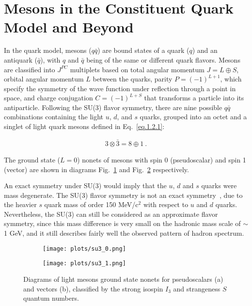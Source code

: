 \section{Mesons in the Constituent Quark Model and Beyond}
\label{p.1.2}

In the quark model, mesons ($q\bar{q}$) are bound states of a quark ($q$) and an antiquark ($\bar{q}$), with $q$ and $\bar{q}$ being of the same or different quark flavors. Mesons are classified into $J^{PC}$ multiplets based on  total angular momentum $J = L \oplus S$, orbital angular momentum $L$ between the quarks, parity $P=(-1)^{L+1}$, which specify the symmetry of the wave function under reflection through a point in space, and charge conjugation $C=(-1)^{L+S}$ that transforms a particle into its antiparticle. Following the SU(3) flavor symmetry, there are nine possible $q\bar{q}$ combinations containing the light $u$, $d$, and $s$ quarks, grouped into an octet and a singlet of light quark mesons defined in Eq.~\ref{eq.1.2.1}:

\begin{equation}
    \label{eq.1.2.1}
    \begin{aligned}
        3 \otimes \bar{3} = 8 \oplus 1~.
    \end{aligned}
\end{equation}

The ground state ($L=0$) nonets of mesons with spin 0 (pseudoscalar) and spin 1 (vector) are shown in diagrams Fig.~\ref{fig.1.2.1.a} and Fig.~\ref{fig.1.2.1.b} respectively.
~\par An exact symmetry under SU(3) would imply that the $u$, $d$ and $s$ quarks were mass degenerate. The SU(3) flavor symmetry is not an exact symmetry~\cite{Zweig64}, due to the heavier $s$ quark mass of order 150 MeV/c$^{2}$ with respect to $u$ and $d$ quarks. Nevertheless, the SU(3) can still be considered as an approximate flavor symmetry, since this mass difference is very small on the hadronic mass scale of $\sim$ 1 GeV, and it still describes fairly well the observed pattern of hadron spectrum.

\begin{figure}[H]
    \centering
    \begin{subfigure}[H]{0.5\textwidth}
        \texttt{[image: plots/su3\_0.png]}
        \caption{}
        \label{fig.1.2.1.a}
    \end{subfigure}\hfill
    \begin{subfigure}[H]{0.5\textwidth}
        \texttt{[image: plots/su3\_1.png]}
        \caption{}
        \label{fig.1.2.1.b}
    \end{subfigure}
    \caption{Diagrams of light mesons ground state nonets for pseudoscalars (a) and vectors (b), classified by the strong isospin $I_3$ and strangeness $S$ quantum numbers.}
    \label{fig.1.2.1}
\end{figure}

